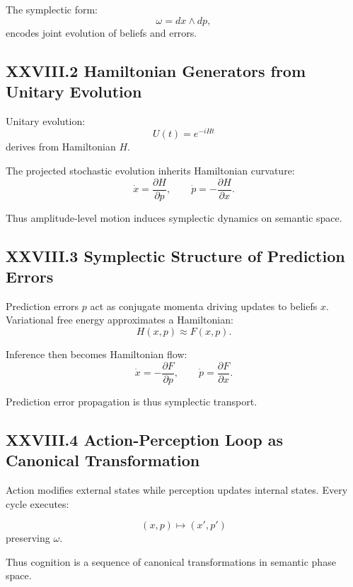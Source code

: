 \documentclass[11pt,letterpaper]{article}
\begin{document}
The symplectic form:
\[
\omega = dx \wedge dp,
\]
encodes joint evolution of beliefs and errors.

\subsection{XXVIII.2 Hamiltonian Generators from Unitary Evolution}

Unitary evolution:
\[
U(t) = e^{-iHt}
\]
derives from Hamiltonian $H$.

The projected stochastic evolution inherits Hamiltonian curvature:
\[
\dot{x} = \frac{\partial H}{\partial p}, \qquad
\dot{p} = -\frac{\partial H}{\partial x}.
\]

Thus amplitude-level motion induces symplectic dynamics on semantic space.

\subsection{XXVIII.3 Symplectic Structure of Prediction Errors}

Prediction errors $p$ act as conjugate momenta driving updates to beliefs $x$.  
Variational free energy approximates a Hamiltonian:
\[
H(x,p) \approx F(x,p).
\]

Inference then becomes Hamiltonian flow:
\[
\dot{x} = -\frac{\partial F}{\partial p}, \qquad
\dot{p} = \frac{\partial F}{\partial x}.
\]

Prediction error propagation is thus symplectic transport.

\subsection{XXVIII.4 Action-Perception Loop as Canonical Transformation}

Action modifies external states while perception updates internal states.  
Every cycle executes:

\[
(x,p) \mapsto (x',p')
\]
preserving $\omega$.

Thus cognition is a sequence of canonical transformations in semantic phase space.

\end{document}
